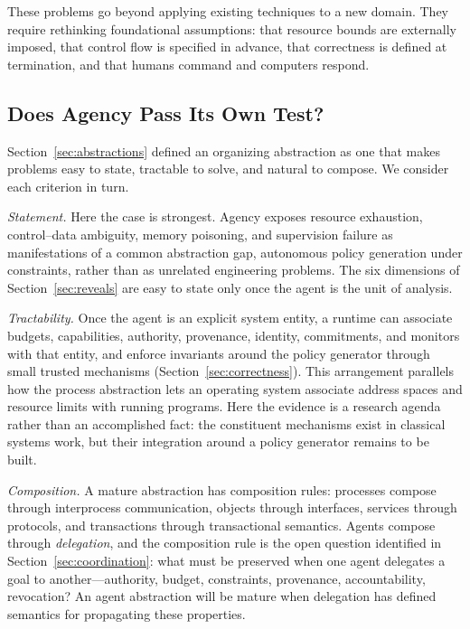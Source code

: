 \documentclass[11pt]{article}
\begin{document}
These problems go beyond applying existing techniques to a new domain. They require rethinking foundational assumptions: that resource bounds are externally imposed, that control flow is specified in advance, that correctness is defined at termination, and that humans command and computers respond.

\subsection{Does Agency Pass Its Own Test?}
\label{sec:test}

Section~\ref{sec:abstractions} defined an organizing abstraction as one that makes problems easy to state, tractable to solve, and natural to compose. We consider each criterion in turn.

\textit{Statement.} Here the case is strongest. Agency exposes resource exhaustion, control--data ambiguity, memory poisoning, and supervision failure as manifestations of a common abstraction gap, autonomous policy generation under constraints, rather than as unrelated engineering problems. The six dimensions of Section~\ref{sec:reveals} are easy to state only once the agent is the unit of analysis.

\textit{Tractability.} Once the agent is an explicit system entity, a runtime can associate budgets, capabilities, authority, provenance, identity, commitments, and monitors with that entity, and enforce invariants around the policy generator through small trusted mechanisms (Section~\ref{sec:correctness}). This arrangement parallels how the process abstraction lets an operating system associate address spaces and resource limits with running programs. Here the evidence is a research agenda rather than an accomplished fact: the constituent mechanisms exist in classical systems work, but their integration around a policy generator remains to be built.

\textit{Composition.} A mature abstraction has composition rules: processes compose through interprocess communication, objects through interfaces, services through protocols, and transactions through transactional semantics. Agents compose through \textit{delegation}, and the composition rule is the open question identified in Section~\ref{sec:coordination}: what must be preserved when one agent delegates a goal to another---authority, budget, constraints, provenance, accountability, revocation? An agent abstraction will be mature when delegation has defined semantics for propagating these properties.
\end{document}
